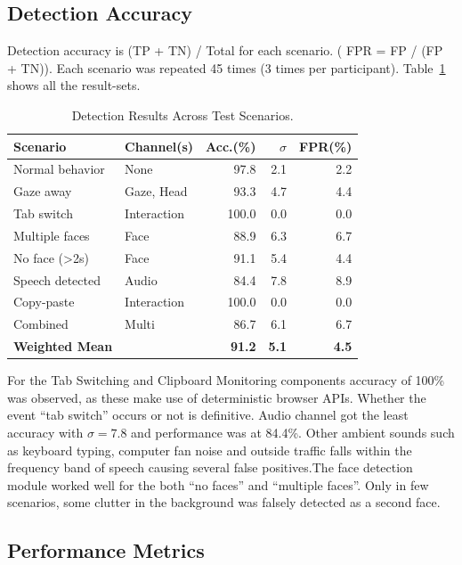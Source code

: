 \documentclass[runningheads]{llncs}
\begin{document}
\subsection{Detection Accuracy}

Detection accuracy is (TP + TN) / Total for each scenario. ( FPR = FP / (FP + TN)). Each scenario was repeated 45 times (3 times per participant). Table~\ref{tab:results} shows all the result-sets.

\begin{table}[htbp]
\caption{Detection Results Across Test Scenarios.}\label{tab:results}
\centering
\scriptsize
\setlength{\tabcolsep}{4pt}
\begin{tabular}{@{}llrrr@{}}
\toprule
\textbf{Scenario} & \textbf{Channel(s)} & \textbf{Acc.(\%)} & \textbf{$\sigma$} & \textbf{FPR(\%)} \\
\midrule
Normal behavior   & None        & 97.8 & 2.1 & 2.2 \\
Gaze away         & Gaze, Head  & 93.3 & 4.7 & 4.4 \\
Tab switch        & Interaction & 100.0 & 0.0 & 0.0 \\
Multiple faces    & Face        & 88.9 & 6.3 & 6.7 \\
No face ({>}2s)   & Face        & 91.1 & 5.4 & 4.4 \\
Speech detected   & Audio       & 84.4 & 7.8 & 8.9 \\
Copy-paste        & Interaction & 100.0 & 0.0 & 0.0 \\
Combined          & Multi       & 86.7 & 6.1 & 6.7 \\
\midrule
\textbf{Weighted Mean} &        & \textbf{91.2} & \textbf{5.1} & \textbf{4.5} \\
\bottomrule
\end{tabular}
\end{table}

For the Tab Switching and Clipboard Monitoring components accuracy of 100\% was observed, as these make use of deterministic browser APIs. Whether the event ``tab switch'' occurs or not is definitive. Audio channel got the least accuracy with $\sigma=7.8$ and performance was at 84.4\%. Other ambient sounds such as keyboard typing, computer fan noise and outside traffic falls within the frequency band of speech causing several false positives.The face detection module worked well for the both ``no faces'' and ``multiple faces''. Only in few scenarios, some clutter in the background was falsely detected as a second face.

\subsection{Performance Metrics}
\end{document}
